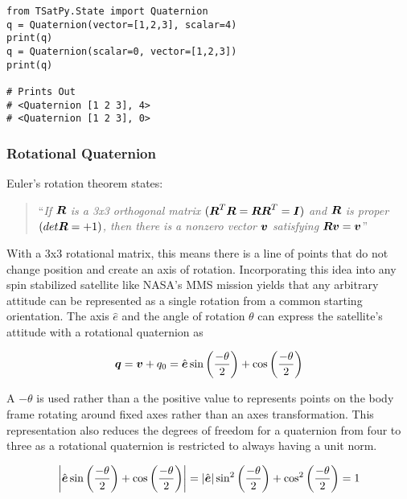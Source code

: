 \begin{singlespace}
  \begin{verbatim}
from TSatPy.State import Quaternion
q = Quaternion(vector=[1,2,3], scalar=4)
print(q)
q = Quaternion(scalar=0, vector=[1,2,3])
print(q)

# Prints Out
# <Quaternion [1 2 3], 4>
# <Quaternion [1 2 3], 0>
  \end{verbatim}
  \nocite{minted}
\end{singlespace}

\subsubsection{Rotational Quaternion}
\label{subsubsec:RotationalQuaternion}

Euler's rotation theorem states:

\begin{quote}{``\textsl{If $\boldsymbol{R}$ is a 3x3 orthogonal matrix $( \boldsymbol{R}^T \boldsymbol{R} = \boldsymbol{R}\boldsymbol{R}^T = \boldsymbol{I} )$ and $\boldsymbol{R}$ is proper $( det \boldsymbol{R} = +1 )$, then there is a nonzero vector $\boldsymbol{v}$ satisfying $\boldsymbol{Rv} = \boldsymbol{v}$}''~\cite{euler_theorem}}\end{quote}

With a 3x3 rotational matrix, this means there is a line of points that do not change position and create an axis of rotation.  Incorporating this idea into any spin stabilized satellite like NASA's MMS mission yields that any arbitrary attitude can be represented as a single rotation from a common starting orientation.  The axis $\hat{e}$ and the angle of rotation $\theta$ can express the satellite's attitude with a rotational quaternion as

\begin{equation}
  \boldsymbol{q} = \boldsymbol{v} + q_0 = \hat{\boldsymbol{e}} \sin \left( \frac{-\theta}{2} \right) + \cos \left( \frac{-\theta}{2} \right)
  \label{eqn:RotationalQuaternionDefinition}
\end{equation}

A $-\theta$ is used rather than a the positive value to represents points on the body frame rotating around fixed axes rather than an axes transformation.  This representation also reduces the degrees of freedom for a quaternion from four to three as a rotational quaternion is restricted to always having a unit norm.

\begin{equation}
  \left| \hat{\boldsymbol{e}} \sin \left( \frac{-\theta}{2} \right) + \cos \left( \frac{-\theta}{2} \right) \right| = \left| \hat{\boldsymbol{e}} \right|  \sin^2 \left( \frac{-\theta}{2} \right) + \cos^2 \left( \frac{-\theta}{2} \right) = 1
\end{equation}

